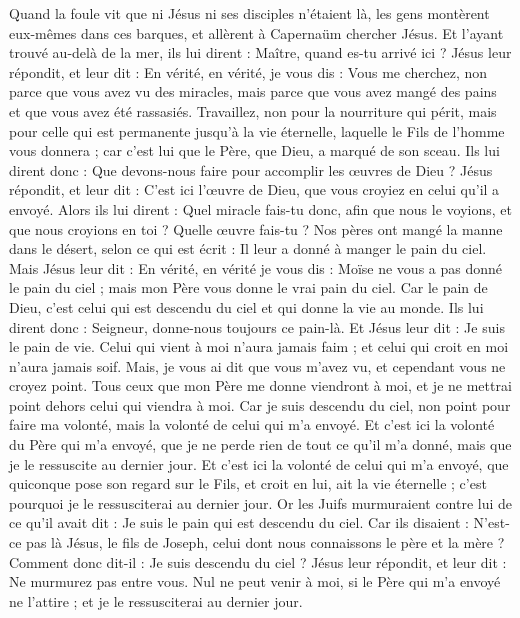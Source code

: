 \begin{multicols}{2}
Quand la foule vit que ni Jésus ni ses disciples n'étaient là, les gens montèrent eux-mêmes dans ces barques, et allèrent à Capernaüm chercher Jésus.
Et l'ayant trouvé au-delà de la mer, ils lui dirent : Maître, quand es-tu arrivé ici ?
Jésus leur répondit, et leur dit : En vérité, en vérité, je vous dis : Vous me cherchez, non parce que vous avez vu des miracles, mais parce que vous avez mangé des pains et que vous avez été rassasiés.
Travaillez, non pour la nourriture qui périt, mais pour celle qui est permanente jusqu'à la vie éternelle, laquelle le Fils de l'homme vous donnera ; car c'est lui que le Père, que Dieu, a marqué de son sceau.
Ils lui dirent donc : Que devons-nous faire pour accomplir les œuvres de Dieu ?
Jésus répondit, et leur dit : C'est ici l'œuvre de Dieu, que vous croyiez en celui qu'il a envoyé.
Alors ils lui dirent : Quel miracle fais-tu donc, afin que nous le voyions, et que nous croyions en toi ? Quelle œuvre fais-tu ?
Nos pères ont mangé la manne dans le désert, selon ce qui est écrit : Il leur a donné à manger le pain du ciel.
Mais Jésus leur dit : En vérité, en vérité je vous dis : Moïse ne vous a pas donné le pain du ciel ; mais mon Père vous donne le vrai pain du ciel.
Car le pain de Dieu, c'est celui qui est descendu du ciel et qui donne la vie au monde.
Ils lui dirent donc : Seigneur, donne-nous toujours ce pain-là.
Et Jésus leur dit : Je suis le pain de vie. Celui qui vient à moi n'aura jamais faim ; et celui qui croit en moi n'aura jamais soif.
Mais, je vous ai dit que vous m'avez vu, et cependant vous ne croyez point.
Tous ceux que mon Père me donne viendront à moi, et je ne mettrai point dehors celui qui viendra à moi.
Car je suis descendu du ciel, non point pour faire ma volonté, mais la volonté de celui qui m'a envoyé.
Et c'est ici la volonté du Père qui m'a envoyé, que je ne perde rien de tout ce qu'il m'a donné, mais que je le ressuscite au dernier jour.
Et c'est ici la volonté de celui qui m'a envoyé, que quiconque pose son regard sur le Fils, et croit en lui, ait la vie éternelle ; c'est pourquoi je le ressusciterai au dernier jour.
Or les Juifs murmuraient contre lui de ce qu'il avait dit : Je suis le pain qui est descendu du ciel.
Car ils disaient : N'est-ce pas là Jésus, le fils de Joseph, celui dont nous connaissons le père et la mère ? Comment donc dit-il : Je suis descendu du ciel ?
Jésus leur répondit, et leur dit : Ne murmurez pas entre vous.
Nul ne peut venir à moi, si le Père qui m'a envoyé ne l'attire ; et je le ressusciterai au dernier jour.

\end{multicols}
